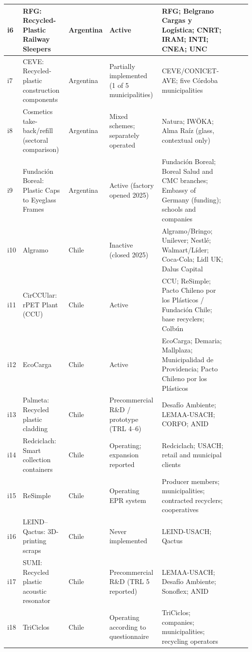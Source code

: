 \documentclass[
  12pt,
  oneside]{book}
\begin{document}
\begin{table}
{\begin{tabular}[t]{>{\raggedright\arraybackslash}p{2cm}>{\raggedright\arraybackslash}p{4cm}>{\raggedright\arraybackslash}p{4cm}>{\raggedright\arraybackslash}p{4cm}llll}
i6 & RFG: Recycled-Plastic Railway Sleepers & Argentina & Active & RFG; Belgrano Cargas y Logística; CNRT; IRAM; INTI; CNEA; UNC &  &  & \\
\midrule\addlinespace
i7 & CEVE: Recycled-plastic construction components & Argentina & Partially implemented (1 of 5 municipalities) & CEVE/CONICET-AVE; five Córdoba municipalities &  &  & \\
\midrule\addlinespace
i8 & Cosmetics take-back/refill (sectoral comparison) & Argentina & Mixed schemes; separately operated & Natura; IWÖKA; Alma Raíz (glass, contextual only) &  &  & \\
\midrule\addlinespace
i9 & Fundación Boreal: Plastic Caps to Eyeglass Frames & Argentina & Active (factory opened 2025) & Fundación Boreal; Boreal Salud and CMC branches; Embassy of Germany (funding); schools and companies &  &  & \\
\midrule\addlinespace
i10 & Algramo & Chile & Inactive (closed 2025) & Algramo/Bringo; Unilever; Nestlé; Walmart/Líder; Coca-Cola; Lidl UK; Dalus Capital &  &  & \\
\midrule\addlinespace
i11 & CirCCUlar: rPET Plant (CCU) & Chile & Active & CCU; ReSimple; Pacto Chileno por los Plásticos / Fundación Chile; base recyclers; Colbún &  &  & \\
\midrule\addlinespace
i12 & EcoCarga & Chile & Active & EcoCarga; Demaria; Mallplaza; Municipalidad de Providencia; Pacto Chileno por los Plásticos &  &  & \\
\midrule\addlinespace
i13 & Palmeta: Recycled plastic cladding & Chile & Precommercial R\&D / prototype (TRL 4–6) & Desafío Ambiente; LEMAA-USACH; CORFO; ANID &  &  & \\
\midrule\addlinespace
i14 & Redciclach: Smart collection containers & Chile & Operating; expansion reported & Redciclach; USACH; retail and municipal clients &  &  & \\
\midrule\addlinespace
i15 & ReSimple & Chile & Operating EPR system & Producer members; municipalities; contracted recyclers; cooperatives &  &  & \\
\midrule\addlinespace
i16 & LEIND–Qactus: 3D-printing scraps & Chile & Never implemented & LEIND-USACH; Qactus &  &  & \\
\midrule\addlinespace
i17 & SUMI: Recycled plastic acoustic resonator & Chile & Precommercial R\&D (TRL 5 reported) & LEMAA-USACH; Desafío Ambiente; Sonoflex; ANID &  &  & \\
\midrule\addlinespace
i18 & TriCiclos & Chile & Operating according to questionnaire & TriCiclos; companies; municipalities; recycling operators &  &  & \\

\end{tabular}}
\end{table}
\end{document}
